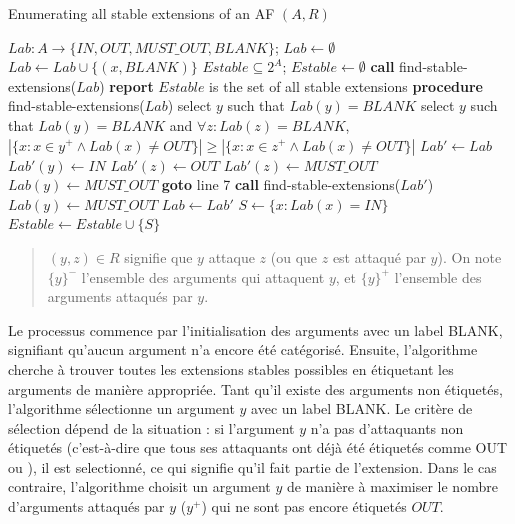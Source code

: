 \documentclass{rapportECL}
\begin{document}
\begin{itemize}
	\begin{algorithm}
		\caption{Enumerating all stable extensions of an AF $(A, R)$}
		\begin{algorithmic}[1]
			\STATE $Lab : A \to \{IN, OUT,  MUST\_OUT, BLANK\}$; $Lab \gets \emptyset$
				\STATE $Lab \gets Lab \cup \{(x, BLANK)\}$
			\ENDFOR
			\STATE $Estable \subseteq 2^A$; $Estable \gets \emptyset$
			\STATE \textbf{call} find-stable-extensions($Lab$)
			\STATE \textbf{report} $Estable$ is the set of all stable extensions
			\STATE \textbf{procedure} find-stable-extensions($Lab$)
					\STATE select $y$ such that $Lab(y) = BLANK$
				\ELSE
					\STATE select $y$ such that $Lab(y) = BLANK$ and $\forall z : Lab(z) = BLANK$, 
					\STATE $\left| \{x : x \in {y}^+ \land Lab(x) \neq OUT \} \right| \geq \left| \{x : x \in {z}^+ \land Lab(x) \neq OUT \} \right|$
				\ENDIF
				\STATE $Lab' \gets Lab$
				\STATE $Lab'(y) \gets IN$
					\STATE $Lab'(z) \gets OUT$
				\ENDFOR
						\STATE $Lab'(z) \gets  MUST\_OUT$
					\ENDIF
						\STATE $Lab(y) \gets  MUST\_OUT$
					\ENDIF
				\ENDFOR
				\STATE \textbf{goto} line 7
				\STATE \textbf{call} find-stable-extensions($Lab'$)
					\STATE $Lab(y) \gets  MUST\_OUT$
				\ELSE
					\STATE $Lab \gets Lab'$
				\ENDIF
					\STATE $S \gets \{x : Lab(x) = IN\}$
					\STATE $Estable \gets Estable \cup \{S\}$
				\ENDIF
			\ENDWHILE
		\end{algorithmic}
	\end{algorithm}
	\begin{quote}
$(y, z) \in R$ signifie que $y$ attaque $z$ (ou que $z$ est attaqué par $y$).  
On note $\{y\}^-$ l'ensemble des arguments qui attaquent $y$,  
et $\{y\}^+$ l'ensemble des arguments attaqués par $y$.  
	\end{quote}	


Le processus commence par l'initialisation des arguments avec un label  {BLANK}, signifiant qu'aucun argument n'a encore été catégorisé. 
Ensuite, l'algorithme cherche à trouver toutes les extensions stables possibles en étiquetant les arguments de manière appropriée. 
Tant qu'il existe des arguments non étiquetés, l'algorithme sélectionne un argument \( y \) avec un label  {BLANK}. 
Le critère de sélection dépend de la situation : si l'argument \( y \) n'a pas d'attaquants non étiquetés (c'est-à-dire que tous ses attaquants ont déjà été étiquetés comme  {OUT} ou ), il est selectionné, 
ce qui signifie qu'il fait partie de l'extension.  Dans le cas contraire, l'algorithme choisit un argument \( y \) de manière à maximiser le nombre d'arguments attaqués par \( y \) (\( {y}^+ \)) qui ne sont pas encore étiquetés \(  {OUT} \).



\end{itemize}
\end{document}

